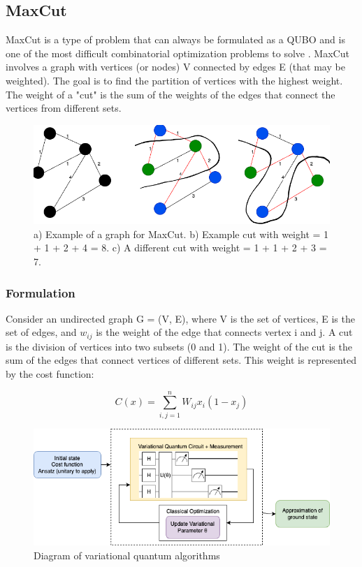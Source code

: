 \subsection{MaxCut}
MaxCut is a type of problem that can always be formulated as a QUBO and is one of the most difficult combinatorial optimization problems to solve \cite{CommanderMaxCut}. MaxCut involves a graph with vertices (or nodes) V connected by edges E (that may be weighted). The goal is to find the partition of vertices with the highest weight. The weight of a "cut" is the sum of the weights of the edges that connect the vertices from different sets. 
\begin{figure}[H]
    \centering
    \includegraphics[width=1\linewidth]{images/MaCutExample.drawio.png}
    \caption{a) Example of a graph for MaxCut. b) Example cut with weight = 1 + 1 + 2 + 4 = 8. c) A different cut with weight = 1 + 1 + 2 + 3 = 7.}
    \label{fig:2.1}
\end{figure}

\subsubsection{Formulation}
Consider an undirected graph G = (V, E), where V is the set of vertices, E is the set of edges, and $w_{ij}$ is the weight of the edge that connects vertex i and j. A cut is the division of vertices into two subsets (0 and 1). The weight of the cut is the sum of the edges that connect vertices of different sets. This weight is represented by the cost function:

    \begin{equation} 
        C(x) = \sum_{i,j=1}^{n} W_{ij} x_i(1-x_j)
    \end{equation}

\begin{figure}[ht]
    \centering
    \includegraphics[width=0.8\linewidth]{images/VariationalDiagram.drawio.png}
    \caption{Diagram of variational quantum algorithms}
    \label{fig:enter-label}
\end{figure}

